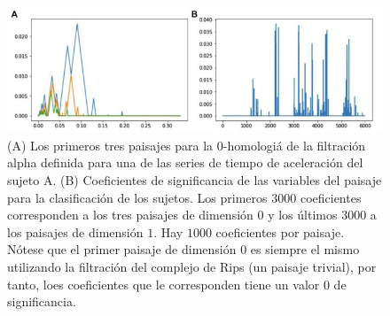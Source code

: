 \begin{figure}[ht]
    \centering
    \includegraphics[width=0.85\linewidth]{./figures/Figura15.JPG}
    \caption{
        (A) Los primeros tres paisajes para la $0$-homologi\'a de la filtraci\'on alpha
        definida para una de las series de tiempo de aceleraci\'on del sujeto A.
        (B) Coeficientes de significancia de las variables del paisaje para la clasificaci\'on
        de los sujetos.
        Los primeros $3000$ coeficientes corresponden a los tres paisajes de dimensi\'on $0$
        y los \'ultimos $3000$ a los paisajes de dimensi\'on $1$.
        Hay $1000$ coeficientes por paisaje.
        N\'otese que el primer paisaje de dimensi\'on $0$ es siempre el mismo
        utilizando la filtraci\'on del complejo de Rips (un paisaje trivial), por tanto,
        loes coeficientes que le corresponden tiene un valor $0$ de significancia.
    }
    \label{fig:Figura 15}
    \vspace{15pt}
\end{figure}